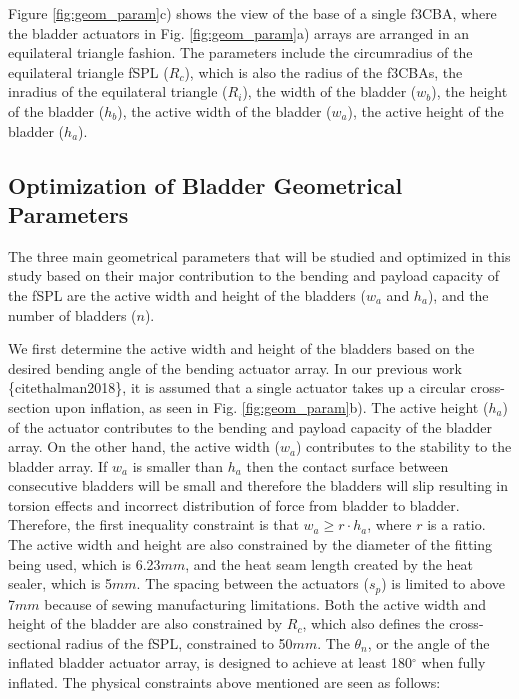 \documentclass[letterpaper, 10 pt, conference]{ieeeconf}  %
\begin{document}
Figure \ref{fig:geom_param}c) shows the view of the base of a single f3CBA, where the bladder actuators in Fig. \ref{fig:geom_param}a) arrays are arranged in an equilateral triangle fashion. The parameters include the circumradius of the equilateral triangle fSPL ($R_{c}$), which is also the radius of the f3CBAs, the inradius of the equilateral triangle ($R_{i}$), the width of the bladder ($w_{b}$), the height of the bladder ($h_{b}$), the active width of the bladder ($w_{a}$), the active height of the bladder ($h_{a}$). 

\subsection{Optimization of Bladder Geometrical Parameters}
The three main geometrical parameters that will be studied and optimized in this study based on their major contribution to the bending and payload capacity of the fSPL are the active width and height of the bladders ($w_{a}$ and $h_{a}$), and the number of bladders ($n$).

We first determine the active width and height of the bladders based on the desired bending angle of the bending actuator array. In our previous work \{cite{thalman2018}\}, it is assumed that a single actuator takes up a circular cross-section upon inflation, as seen in Fig. \ref{fig:geom_param}b). The active height ($h_{a}$) of the actuator contributes to the bending and payload capacity of the bladder array. On the other hand, the active width ($w_{a}$) contributes to the stability to the bladder array. If $w_{a}$ is smaller than $h_{a}$ then the contact surface between consecutive bladders will be small and therefore the bladders will slip resulting in torsion effects and incorrect distribution of force from bladder to bladder. Therefore, the first inequality constraint is that $w_{a} \geq r \cdot h_{a}$, where $r$ is a ratio. The active width and height are also constrained by the diameter of the fitting being used, which is 6.23$mm$, and the heat seam length created by the heat sealer, which is 5$mm$. The spacing between the actuators ($s_{p}$) is limited to above 7$mm$ because of sewing manufacturing limitations. Both the active width and height of the bladder are also constrained by $R_{c}$, which also defines the cross-sectional radius of the fSPL, constrained to 50$mm$. The $\theta_{n}$, or the angle of the inflated bladder actuator array, is designed to achieve at least 180$^{\circ}$ when fully inflated. The physical constraints above mentioned are seen as follows:
\end{document}
